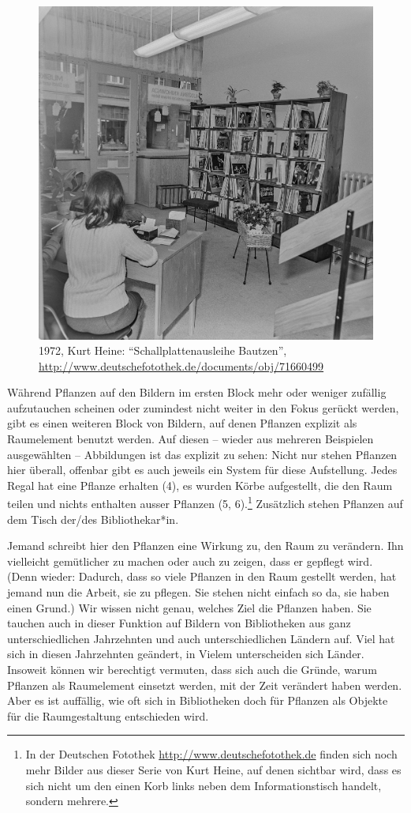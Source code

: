\documentclass[a4paper,
fontsize=11pt,
oneside,
numbers=noperiodatend,
parskip=half-,
bibliography=totoc,
final
]{scrartcl}
\begin{document}
\begin{figure}
\centering
\includegraphics[width=0.7\columnwidth]{img/df-0008165.jpg}
\caption{1972, Kurt Heine: \enquote{Schallplattenausleihe Bautzen},
\url{http://www.deutschefotothek.de/documents/obj/71660499}}
\end{figure}

Während Pflanzen auf den Bildern im ersten Block mehr oder weniger
zufällig aufzutauchen scheinen oder zumindest nicht weiter in den Fokus
gerückt werden, gibt es einen weiteren Block von Bildern, auf denen
Pflanzen explizit als Raumelement benutzt werden. Auf diesen -- wieder
aus mehreren Beispielen ausgewählten -- Abbildungen ist das explizit zu
sehen: Nicht nur stehen Pflanzen hier überall, offenbar gibt es auch
jeweils ein System für diese Aufstellung. Jedes Regal hat eine Pflanze
erhalten (4), es wurden Körbe aufgestellt, die den Raum teilen und
nichts enthalten ausser Pflanzen (5, 6).\footnote{In der Deutschen
  Fotothek \url{http://www.deutschefotothek.de} finden sich noch mehr
  Bilder aus dieser Serie von Kurt Heine, auf denen sichtbar wird, dass
  es sich nicht um den einen Korb links neben dem Informationstisch
  handelt, sondern mehrere.} Zusätzlich stehen Pflanzen auf dem Tisch
der/des Bibliothekar*in.

Jemand schreibt hier den Pflanzen eine Wirkung zu, den Raum zu
verändern. Ihn vielleicht gemütlicher zu machen oder auch zu zeigen,
dass er gepflegt wird. (Denn wieder: Dadurch, dass so viele Pflanzen in
den Raum gestellt werden, hat jemand nun die Arbeit, sie zu pflegen. Sie
stehen nicht einfach so da, sie haben einen Grund.) Wir wissen nicht
genau, welches Ziel die Pflanzen haben. Sie tauchen auch in dieser
Funktion auf Bildern von Bibliotheken aus ganz unterschiedlichen
Jahrzehnten und auch unterschiedlichen Ländern auf. Viel hat sich in
diesen Jahrzehnten geändert, in Vielem unterscheiden sich Länder.
Insoweit können wir berechtigt vermuten, dass sich auch die Gründe,
warum Pflanzen als Raumelement einsetzt werden, mit der Zeit verändert
haben werden. Aber es ist auffällig, wie oft sich in Bibliotheken doch
für Pflanzen als Objekte für die Raumgestaltung entschieden wird.
\end{document}
